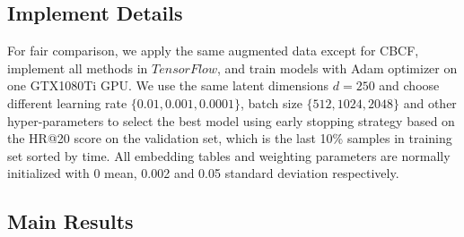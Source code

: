 \subsection{Implement Details}
For fair comparison, we apply the same augmented data except for CBCF, implement all methods in $TensorFlow$, and train models with Adam optimizer on one GTX1080Ti GPU. We use the same latent dimensions $d=250$ and choose different learning rate $\{0.01, 0.001, 0.0001\}$, batch size $\{512, 1024, 2048\}$ and other hyper-parameters to select the best model using early stopping strategy based on the HR@20 score on the validation set, which is the last 10\% samples in training set sorted by time. All embedding tables and weighting parameters are normally initialized with 0 mean, 0.002 and 0.05 standard deviation respectively.

\subsection{Main Results}
\label{sec:mainres}
